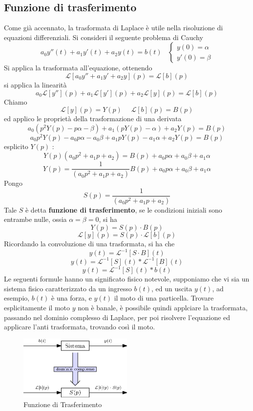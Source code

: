 \documentclass[10pt, letterpaper]{report}
\begin{document}
\subsection{Funzione di trasferimento}
Come già accennato, la trasformata di Laplace è utile nella risoluzione di equazioni differenziali. Si consideri 
il seguente problema di Cauchy
$$ a_0y''(t)+a_1y'(t)+a_2y(t)=b(t)\ \ \ \ \begin{cases}
    y(0)=\alpha\\ y'(0)=\beta
\end{cases}$$ 
Si applica la trasformata all'equazione, ottenendo 
$$ \mathcal{L}[a_0y''+a_1y'+a_2y](p)=\mathcal{L}[b](p)$$
si applica la linearità 
$$a_0\mathcal{L}[y''](p)+a_1\mathcal{L}[y'](p)+a_2\mathcal{L}[y](p)=\mathcal{L}[b](p)$$
Chiamo $$ \mathcal{L}[y](p) = Y(p)\ \ \ \ \ \ \mathcal{L}[b](p)=B(p)$$
ed applico le proprietà della trasformazione di una derivata 
$$a_0(p^2Y(p)-p\alpha-\beta)+a_1(pY(p)-\alpha)+a_2Y(p)=B(p) $$
$$a_0p^2Y(p)-a_0p\alpha-a_0\beta+a_1pY(p)-a_1\alpha+a_2Y(p)=B(p) $$
esplicito $Y(p)$ : 
$$ Y(p)(a_0p^2+a_1p+a_2)=B(p)+a_0p\alpha+a_0\beta+a_1\alpha $$
$$ Y(p)=\frac{1}{(a_0p^2+a_1p+a_2)}B(p)+a_0p\alpha+a_0\beta+a_1\alpha $$
Pongo 
$$S(p)=\frac{1}{(a_0p^2+a_1p+a_2)} $$
Tale $S$ è detta \textbf{funzione di trasferimento}, se le condizioni iniziali sono entrambe nulle, ossia 
$\alpha=\beta=0$, si ha 
$$ Y(p)=S(p)\cdot B(p)$$
$$ \mathcal{L}[y](p)=S(p)\cdot \mathcal{L}[b](p) $$
Ricordando la convoluzione di una trasformata, si ha che 
$$y(t)=\mathcal{L}^{-1}[S\cdot B](t)$$ 
$$y(t)=\mathcal{L}^{-1}[S](t)*\mathcal{L}^{-1}[B](t)$$ 
$$y(t)=\mathcal{L}^{-1}[S](t)*b(t)$$ 
Le seguenti formule hanno un significato fisico notevole, supponiamo che vi sia un sistema fisico 
caratterizzato da un ingresso $b(t)$, ed un uscita $y(t)$, ad esempio, $b(t)$ è una forza, e 
$y(t)$ il moto di una particella. Trovare esplicitamente il moto $y$ non è banale, è possibile quindi 
applciare la trasformata, passando nel dominio complesso di Laplace, per poi risolvere l'equazione ed 
applicare l'anti trasformata, trovando così il moto.\begin{center}
    \begin{figure}[h!]\centering
        \includegraphics[width=0.5\textwidth ]{images/funTrasf.eps}
        \caption{Funzione di Trasferimento}
     \end{figure}\end{center}
\end{document}
